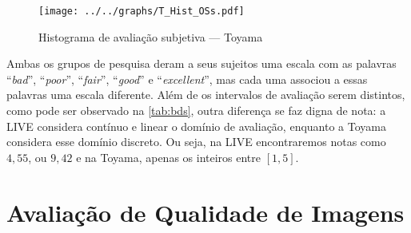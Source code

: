 \begin{figure}[htb]
	\centering
	\begin{minipage}{.8\textwidth}
		\centering
		\caption{Histograma de avaliação subjetiva --- Toyama}\label{graf:toyaHist}
		\texttt{[image: ../../graphs/T\_Hist\_OSs.pdf]}
	\end{minipage}
\end{figure}

Ambas os grupos de pesquisa deram a seus sujeitos uma escala com as palavras ``\emph{bad}'', ``\emph{poor}'', ``\emph{fair}'', ``\emph{good}'' e ``\emph{excellent}'', mas cada uma associou a essas palavras uma escala diferente. Além de os intervalos de avaliação serem distintos, como pode ser observado na \autoref{tab:bds}, outra diferença se faz digna de nota: a LIVE considera contínuo e linear o domínio de avaliação, enquanto a Toyama considera esse domínio discreto. Ou seja, na LIVE encontraremos notas como $4,55$, ou $9,42$ e na Toyama, apenas os inteiros entre $[1,5]$.

\section{Avaliação de Qualidade de Imagens}

